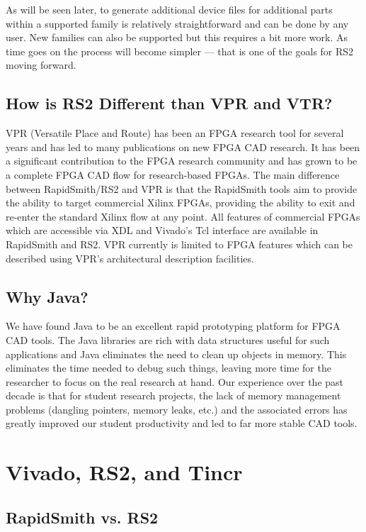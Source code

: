 \documentclass[10pt]{article}
\begin{document}
As will be seen later, to generate additional device files for additional parts
within a supported family is relatively straightforward and can be done by any
user.  New families can also be supported but this
requires a bit more work.  As time goes on the process will become simpler ---
that is one of the goals for RS2 moving forward.

\subsection{How is RS2 Different than VPR and VTR?}
VPR (Versatile Place and Route) has been an FPGA research tool for several years
and has led to many publications on new FPGA CAD research. It has been a
significant contribution to the FPGA research community and has grown to be a
complete FPGA CAD flow for research-based FPGAs. The main difference between
RapidSmith/RS2 and VPR is that the RapidSmith tools aim to provide the ability
to target commercial Xilinx FPGAs, providing the ability to exit and re-enter
the standard Xilinx flow at any point.  All features of commercial FPGAs which
are accessible via XDL and Vivado's Tcl interface are available in RapidSmith
and RS2. VPR currently is limited to FPGA features which can be described using
VPR's architectural description facilities.

\subsection{Why Java?}
We have found Java to be an excellent rapid prototyping platform for FPGA CAD
tools.  The Java libraries are rich with data structures useful for such
applications and Java eliminates the need to clean up objects in memory.  This
eliminates the time needed to debug such things, leaving more time for the
researcher to focus on the real research at hand.  Our experience over the past
decade is that for student research projects, the lack of memory management
problems (dangling pointers, memory leaks, etc.) and the associated errors has
greatly improved our student productivity and led to far more stable CAD tools.

\pagebreak
\section{Vivado, RS2, and Tincr}
\subsection{RapidSmith vs. RS2}
\end{document}
